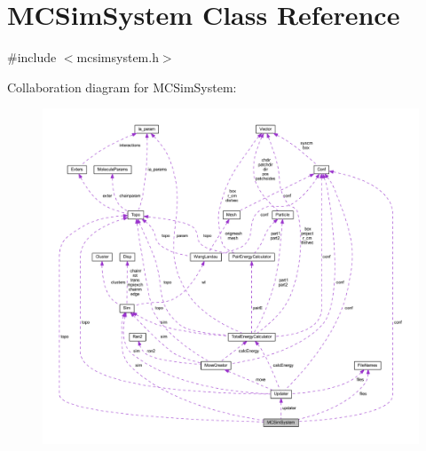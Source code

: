 \hypertarget{class_m_c_sim_system}{\section{M\+C\+Sim\+System Class Reference}
\label{class_m_c_sim_system}
}


{\ttfamily \#include $<$mcsimsystem.\+h$>$}



Collaboration diagram for M\+C\+Sim\+System\+:\nopagebreak
\begin{figure}[H]
\begin{center}
\leavevmode
\includegraphics[width=350pt]{class_m_c_sim_system__coll__graph}
\end{center}
\end{figure}
